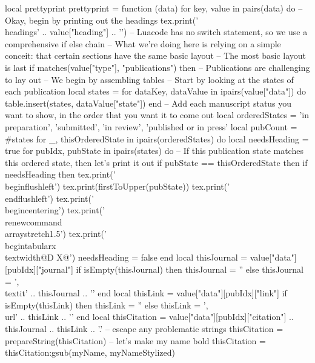 \documentclass[letterpaper, 10pt]{article}
\newcommand{\headings}[1]{\section*{#1} \hrule \vspace{10pt}}
\begin{document}
\begin{luacode}
	local prettyprint
	prettyprint = function (data)
		for key, value in pairs(data) do
			-- Okay, begin by printing out the headings
			tex.print('\\headings{' .. value["heading"] .. '}')
			-- Luacode has no switch statement, so we use a comprehensive if else chain
			-- What we're doing here is relying on a simple conceit: that certain sections have the same basic layout
			-- The most basic layout is last
			if matches(value["type"], {"publications"}) then
				-- Publications are challenging to lay out
				-- We begin by assembling tables
				-- Start by looking at the states of each publication
				local states = {}
				for dataKey, dataValue in ipairs(value["data"]) do
					table.insert(states, dataValue["state"])
				end
				-- Add each manuscript status you want to show, in the order that you want it to come out
				local orderedStates = {'in preparation', 'submitted', 'in review', 'published or in press'}
				local pubCount = #states
				for _, thisOrderedState in ipairs(orderedStates) do
					local needsHeading = true
					for pubIdx, pubState in ipairs(states) do
						-- If this publication state matches this ordered state, then let's print it out 
						if pubState == thisOrderedState then
							if needsHeading then
								tex.print('\\begin{flushleft}')
								tex.print(firstToUpper(pubState))
								tex.print('\\end{flushleft}')
								tex.print('\\begin{centering}')
								tex.print('\\renewcommand{\\arraystretch}{1.5}')
								tex.print('\\begin{tabularx}{\\textwidth}{@{}D X@{}}')
								needsHeading = false
							end
							local thisJournal = value["data"][pubIdx]["journal"]
							if isEmpty(thisJournal) then
								thisJournal = ''
							else
								thisJournal = ', \\textit{' .. thisJournal .. '}' 
							end
							local thisLink = value["data"][pubIdx]["link"]
							if isEmpty(thisLink) then
								thisLink = ''
							else
								thisLink = ', \\url{' .. thisLink .. '}'
							end
							local thisCitation = value["data"][pubIdx]["citation"] .. 
							thisJournal .. thisLink .. '.' 
							-- escape any problematic strings
							thisCitation =  prepareString(thisCitation)
							-- let's make my name bold
							thisCitation = thisCitation:gsub(myName,  myNameStylized)

\end{luacode}
\end{document}
